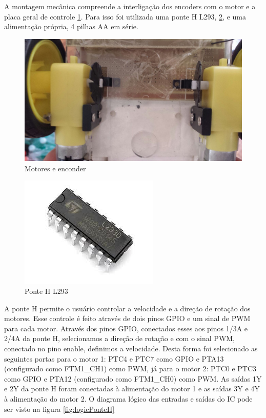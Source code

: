 \documentclass{article}
\begin{document}
A montagem mecânica compreende a interligação dos encoders com o motor e a placa geral de controle  \ref{fig:motor}. Para isso foi utilizada uma ponte H L293, \ref{fig:l293}, e uma alimentação própria, 4 pilhas AA em série. 

\begin{figure}[H]
	\centering
	\includegraphics[width=0.9\linewidth]{motor.JPG}
	\caption{Motores e enconder}
	\label{fig:motor}
\end{figure}

\begin{figure}[H]
	\centering
	\includegraphics[width=0.9\linewidth]{l293.jpg}
	\caption{Ponte H L293}
	\label{fig:l293}
\end{figure}

A ponte H permite o usuário controlar a velocidade e a direção de rotação dos motores. Esse controle é feito através de dois pinos GPIO e um sinal de PWM para cada motor. Através dos pinos GPIO, conectados esses aos pinos 1/3A e 2/4A da ponte H, selecionamos a direção de rotação e com o sinal PWM, conectado no pino enable, definimos a velocidade. Desta forma foi selecionado as seguintes portas para o motor 1: PTC4 e PTC7 como GPIO e PTA13 (configurado como FTM1\_CH1) como PWM, já para o motor 2: PTC0 e PTC3 como GPIO e PTA12 (configurado como FTM1\_CH0) como PWM. As saídas 1Y e 2Y da ponte H foram conectadas à alimentação do motor 1 e as saídas 3Y e 4Y à alimentação do motor 2. O diagrama lógico das entradas e saídas do IC pode ser visto na figura \ref{fig:logicPonteH}
\end{document}
